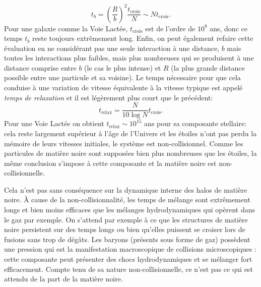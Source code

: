 \begin{equation}
t_b=\left(\frac{R}{b}\right)^2 \frac{t_\mathrm{crois}}{N}\sim N t_\mathrm{crois}.
\end{equation}
Pour une galaxie comme la Voie Lactée, $t_\mathrm{crois}$ est de l'ordre de $10^8$ ans, donc ce temps $t_b$ reste toujours extrêmement long. Enfin, on peut également refaire cette évaluation en ne considérant pas une seule interaction à une distance, $b$ mais toutes les interactions plus faibles, mais plus nombreuses qui se produisent à une distance comprise entre $b$ (le cas le plus intense) et $R$ (la plus grande distance possible entre une particule et sa voisine). Le temps nécessaire pour que cela conduise à une variation de vitesse équivalente à la vitesse typique est appelé \textit{temps de relaxation} et il est légèrement plus court que le précédent:
\begin{equation}
t_\mathrm{relax}=\frac{N}{10\log N} t_\mathrm{crois}.
\end{equation}
Pour une Voie Lactée on obtient $t_\mathrm{relax} \sim 10^{15}$ ans pour sa composante stellaire: cela reste largement supérieur à l'âge de l'Univers et les étoiles n'ont pas perdu la mémoire de leurs vitesses initiales, le système est non-collisionnel. Comme les particules de matière noire sont supposées bien plus nombreuses que les étoiles, la même conclusion s'impose à cette composante et la matière noire est non-collisionnelle.

Cela n'est pas sans conséquence sur la dynamique interne des halos de matière noire. À cause de la non-collisionnalité, les temps de mélange sont extrêmement longs et bien moins efficaces que les mélanges hydrodynamiques qui opèrent dans le gaz par exemple. On s'attend par exemple à ce que les structures de matière noire persistent sur des temps longs ou bien qu'elles puissent se croiser lors de fusions sans trop de dégâts. Les baryons (présents sous forme de gaz) possèdent une pression qui est la manifestation macroscopique de collisions microscopiques : cette composante peut présenter des chocs hydrodynamiques et se mélanger fort efficacement. Compte tenu de sa nature non-collisionnelle, ce n'est pas ce qui est attendu de la part de la matière noire.


